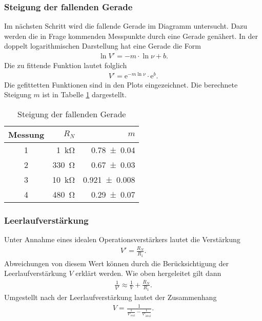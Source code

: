 \subsubsection{Steigung der fallenden Gerade}
Im nächsten Schritt wird die fallende Gerade im Diagramm untersucht.
Dazu werden die in Frage kommenden Messpunkte durch eine Gerade genähert.
In der doppelt logarithmischen Darstellung hat eine Gerade die Form
\begin{align}
	\ln V' = -m \cdot \ln \nu + b.
\end{align}
Die zu fittende Funktion lautet folglich
\begin{align}
	V' = \text{e}^{-m \ln \nu} \cdot \text{e}^b.
\end{align}
Die gefittetten Funktionen sind in den Plots eingezeichnet.
Die berechnete Steigung $m$ ist in Tabelle \ref{tab:m} dargestellt.
\begin{table}
	\centering
	\begin{tabular}{c r r}
		\toprule
		Messung & $R_N$ & $m$ \\
		\midrule
		1 & \SI{1}{\kilo \ohm} & \SI{0.78 \pm 0.04}{} \\
		2 & \SI{330}{\ohm} & \SI{0.67 \pm 0.03}{} \\
		3 & \SI{10}{\kilo \ohm} & \SI{0.921 \pm 0.008}{} \\
		4 & \SI{480}{\ohm} & \SI{0.29 \pm 0.07}{} \\
		\bottomrule
	\end{tabular}
	\caption{Steigung der fallenden Gerade}
	\label{tab:m}
\end{table}

\subsubsection{Leerlaufverstärkung}
Unter Annahme eines idealen Operationsverstärkers lautet die Verstärkung
\begin{align}
	V' = \frac{R_N}{R_1}.
\end{align}
Abweichungen von diesem Wert können durch die Berücksichtigung der Leerlaufverstärkung $V$ erklärt werden.
Wie oben hergeleitet gilt dann
\begin{align}
	\frac{1}{V'} \approx \frac{1}{V} + \frac{R_N}{R_1}.
\end{align}
Umgestellt nach der Leerlaufverstärkung lautet der Zusammenhang
\begin{align}
	V = \frac{1}{\frac{1}{V'_\text{real}} - \frac{1}{V'_\text{ideal}}}.
\end{align}

